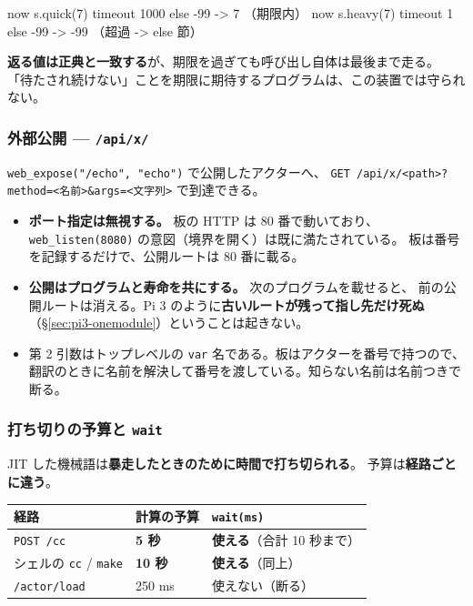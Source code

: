 \documentclass[11pt,a4paper]{ltjsarticle}
\begin{document}
\begin{term}
now s.quick(7) timeout 1000 else -99   ->   7     （期限内）
now s.heavy(7) timeout    1 else -99   -> -99     （超過 -> else 節）
\end{term}

\textbf{返る値は正典と一致する}が、期限を過ぎても呼び出し自体は最後まで走る。
「待たされ続けない」ことを期限に期待するプログラムは、この装置では守られない。

\subsubsection*{外部公開 --- \texttt{/api/x/}}

\texttt{web\_expose("/echo", "echo")} で公開したアクターへ、
\texttt{GET /api/x/<path>?method=<名前>\&args=<文字列>} で到達できる。


\begin{itemize}
\item \textbf{ポート指定は無視する。} 板の HTTP は 80 番で動いており、
  \texttt{web\_listen(8080)} の意図（境界を開く）は既に満たされている。
  板は番号を記録するだけで、公開ルートは 80 番に載る。
\item \textbf{公開はプログラムと寿命を共にする。} 次のプログラムを載せると、
  前の公開ルートは消える。Pi 3 のように\textbf{古いルートが残って指し先だけ死ぬ}
  （\S\ref{sec:pi3-onemodule}）ということは起きない。
\item 第 2 引数はトップレベルの \texttt{var} 名である。板はアクターを番号で持つので、
  翻訳のときに名前を解決して番号を渡している。知らない名前は名前つきで断る。
\end{itemize}

\subsubsection*{打ち切りの予算と \texttt{wait}}
\label{sec:pi5-budget}

JIT した機械語は\textbf{暴走したときのために時間で打ち切られる}。
予算は\textbf{経路ごとに違う}。

\begin{center}
\small
\begin{tabular}{@{}lll@{}}
\toprule
経路 & 計算の予算 & \texttt{wait(ms)} \\
\midrule
\texttt{POST /cc} & \textbf{5 秒} & \textbf{使える}（合計 10 秒まで） \\
シェルの \texttt{cc} / \texttt{make} & \textbf{10 秒} & \textbf{使える}（同上） \\
\texttt{/actor/load} & 250 ms & 使えない（断る） \\
\bottomrule
\end{tabular}
\end{center}
\end{document}
